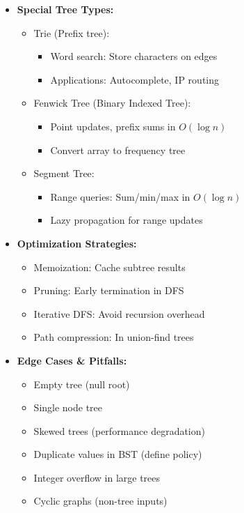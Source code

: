 \documentclass[a4paper,10pt]{book}
\begin{document}
\begin{itemize}
    \item \textbf{Special Tree Types:}
    \begin{itemize}
        \item Trie (Prefix tree):
        \begin{itemize}
            \item Word search: Store characters on edges
            \item Applications: Autocomplete, IP routing
        \end{itemize}
        \item Fenwick Tree (Binary Indexed Tree):
        \begin{itemize}
            \item Point updates, prefix sums in $O(\log n)$
            \item Convert array to frequency tree
        \end{itemize}
        \item Segment Tree:
        \begin{itemize}
            \item Range queries: Sum/min/max in $O(\log n)$
            \item Lazy propagation for range updates
        \end{itemize}
    \end{itemize}
    
    \item \textbf{Optimization Strategies:}
    \begin{itemize}
        \item Memoization: Cache subtree results
        \item Pruning: Early termination in DFS
        \item Iterative DFS: Avoid recursion overhead
        \item Path compression: In union-find trees
    \end{itemize}
    
    \item \textbf{Edge Cases \& Pitfalls:}
    \begin{itemize}
        \item Empty tree (null root)
        \item Single node tree
        \item Skewed trees (performance degradation)
        \item Duplicate values in BST (define policy)
        \item Integer overflow in large trees
        \item Cyclic graphs (non-tree inputs)
    \end{itemize}
    

\end{itemize}
\end{document}
